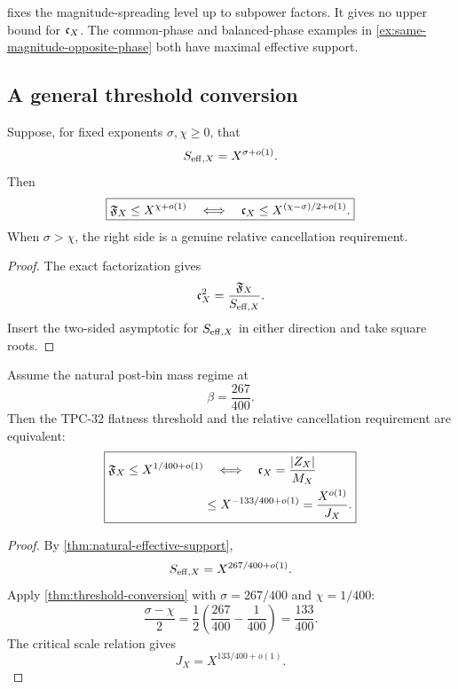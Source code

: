 \begin{remark}
 fixes the magnitude-spreading
level up to subpower factors.  It gives no upper bound for
\(\mathfrak c_X\).  The common-phase and balanced-phase examples in
\cref{ex:same-magnitude-opposite-phase} both have maximal effective
support.
\end{remark}

\subsection{A general threshold conversion}

\begin{theorem}
\label{thm:threshold-conversion}
Suppose, for fixed exponents \(\sigma,\chi\ge0\), that
\[
 S_{\mathrm{eff},X}=X^{\sigma+o(1)}.
\]
Then
\begin{equation}
 \boxed{
 \mathfrak F_X\le X^{\chi+o(1)}
 \quad\Longleftrightarrow\quad
 \mathfrak c_X\le X^{(\chi-\sigma)/2+o(1)}.}
\label{eq:general-threshold-conversion}
\end{equation}
When \(\sigma>\chi\), the right side is a genuine relative
cancellation requirement.
\end{theorem}

\begin{proof}
The exact factorization gives
\[
 \mathfrak c_X^2=\frac{\mathfrak F_X}{S_{\mathrm{eff},X}}.
\]
Insert the two-sided asymptotic for \(S_{\mathrm{eff},X}\) in either direction
and take square roots.
\end{proof}

\begin{theorem}
\label{thm:critical-one-over-J}
Assume the natural post-bin mass regime at
\[
 \beta=\frac{267}{400}.
\]
Then the TPC-32 flatness threshold and the relative cancellation
requirement are equivalent:
\begin{equation}
 \boxed{
 \begin{aligned}
 \mathfrak F_X\le X^{1/400+o(1)}
 &\quad\Longleftrightarrow\quad
 \mathfrak c_X=\frac{|Z_X|}{M_X}\\
 &\le
 X^{-133/400+o(1)}
 =
 \frac{X^{o(1)}}{J_X}.
 \end{aligned}}
\label{eq:critical-one-over-J}
\end{equation}
\end{theorem}

\begin{proof}
By \cref{thm:natural-effective-support},
\[
 S_{\mathrm{eff},X}=X^{267/400+o(1)}.
\]
Apply \cref{thm:threshold-conversion} with
\(\sigma=267/400\) and \(\chi=1/400\):
\[
 \frac{\sigma-\chi}{2}
 =
 \frac12\left(\frac{267}{400}-\frac1{400}\right)
 =
 \frac{133}{400}.
\]
The critical scale relation gives
\[
 J_X=X^{133/400+o(1)}.
\]
\end{proof}

